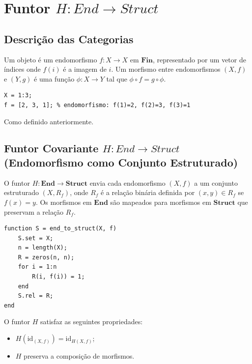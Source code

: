 \section{Funtor \texorpdfstring{$H: End \to Struct$}{H: End -> Struct}}
\label{sec:functor-end-struct}

\subsection{Descrição das Categorias}

\begin{definition}
Um objeto é um endomorfismo $f: X \to X$ em $\mathbf{Fin}$, representado por um vetor de índices onde $f(i)$ é a imagem de $i$. Um morfismo entre endomorfismos $(X, f)$ e $(Y, g)$ é uma função $\phi: X \to Y$ tal que $\phi \circ f = g \circ \phi$.
\end{definition}

\begin{lstlisting}[style=matlab, caption={Objeto e morfismo em $\mathbf{End}$}]
X = 1:3;
f = [2, 3, 1]; % endomorfismo: f(1)=2, f(2)=3, f(3)=1
\end{lstlisting}

\begin{definition}
Como definido anteriormente.
\end{definition}

\subsection{Funtor Covariante \texorpdfstring{$H: End \to Struct$}{H: End -> Struct} (Endomorfismo como Conjunto Estruturado)}

O funtor $H: \mathbf{End} \to \mathbf{Struct}$ envia cada endomorfismo $(X, f)$ a um conjunto estruturado $(X, R_f)$, onde $R_f$ é a relação binária definida por $(x, y) \in R_f$ se $f(x) = y$. Os morfismos em $\mathbf{End}$ são mapeados para morfismos em $\mathbf{Struct}$ que preservam a relação $R_f$.

\begin{lstlisting}[style=matlab, caption={Funtor $H$ aplicado a um endomorfismo}]
function S = end_to_struct(X, f)
    S.set = X;
    n = length(X);
    R = zeros(n, n);
    for i = 1:n
        R(i, f(i)) = 1;
    end
    S.rel = R;
end
\end{lstlisting}

\begin{proposition}
O funtor $H$ satisfaz as seguintes propriedades:
\begin{itemize}
    \item $H(\mathrm{id}_{(X,f)}) = \mathrm{id}_{H(X,f)}$;
    \item $H$ preserva a composição de morfismos.
\end{itemize}
\end{proposition}

